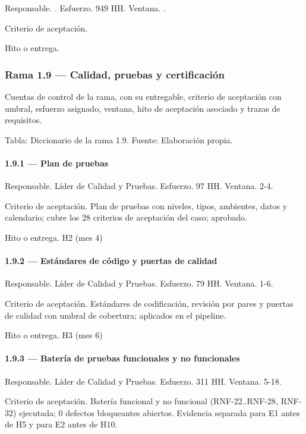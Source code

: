 \documentclass[11pt]{article}
\begin{document}
Responsable. . Esfuerzo. 949 HH. Ventana. .

Criterio de aceptación.

Hito o entrega.

\subsubsection{Rama 1.9 — Calidad, pruebas y certificación}

Cuentas de control de la rama, con su entregable, criterio de aceptación con umbral, esfuerzo asignado, ventana, hito de aceptación asociado y trazas de requisitos.

Tabla: Diccionario de la rama 1.9. Fuente: Elaboración propia.

\paragraph{1.9.1 — Plan de pruebas}

Responsable. Líder de Calidad y Pruebas. Esfuerzo. 97 HH. Ventana. 2-4.

Criterio de aceptación. Plan de pruebas con niveles, tipos, ambientes, datos y calendario; cubre los 28 criterios de aceptación del caso; aprobado.

Hito o entrega. H2 (mes 4)

\paragraph{1.9.2 — Estándares de código y puertas de calidad}

Responsable. Líder de Calidad y Pruebas. Esfuerzo. 79 HH. Ventana. 1-6.

Criterio de aceptación. Estándares de codificación, revisión por pares y puertas de calidad con umbral de cobertura; aplicados en el pipeline.

Hito o entrega. H3 (mes 6)

\paragraph{1.9.3 — Batería de pruebas funcionales y no funcionales}

Responsable. Líder de Calidad y Pruebas. Esfuerzo. 311 HH. Ventana. 5-18.

Criterio de aceptación. Batería funcional y no funcional (RNF-22..RNF-28, RNF-32) ejecutada; 0 defectos bloqueantes abiertos. Evidencia separada para E1 antes de H5 y para E2 antes de H10.
\end{document}
